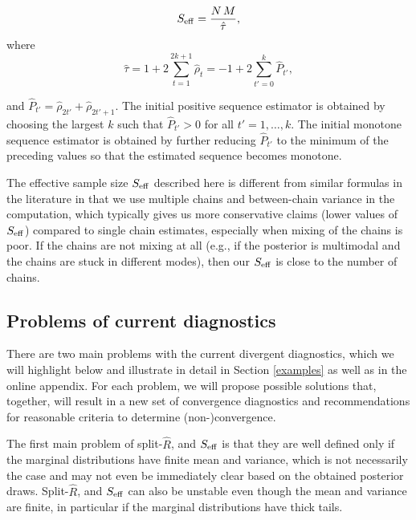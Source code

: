 \documentclass[american,]{article}
\begin{document}
\begin{equation}
S_{\rm eff} = \frac{N \, M}{\hat{\tau}},
\end{equation} where \begin{equation}
\hat{\tau} = 1 + 2 \sum_{t=1}^{2k+1} \hat{\rho}_t = 
-1 + 2 \sum_{t'=0}^{k} \hat{P}_{t'},
\end{equation}

and \(\hat{P}_{t'}=\hat{\rho}_{2t'}+\hat{\rho}_{2t'+1}\). The initial
positive sequence estimator is obtained by choosing the largest \(k\)
such that \(\hat{P}_{t'}>0\) for all \(t' = 1,\ldots,k\). The initial
monotone sequence estimator is obtained by further reducing
\(\hat{P}_{t'}\) to the minimum of the preceding values so that the
estimated sequence becomes monotone.

The effective sample size \(S_{\rm eff}\) described here is different
from similar formulas in the literature in that we use multiple chains
and between-chain variance in the computation, which typically gives us
more conservative claims (lower values of \(S_{\rm eff}\)) compared to
single chain estimates, especially when mixing of the chains is poor. If
the chains are not mixing at all (e.g., if the posterior is multimodal and
the chains are stuck in different modes), then our \(S_{\rm eff}\) is
close to the number of chains.

\hypertarget{problems-of-current-diagnostics}{%
\subsection{Problems of current
diagnostics}\label{problems-of-current-diagnostics}}

There are two main problems with the current divergent diagnostics, which we
will highlight below and illustrate in detail in Section \ref{examples} as well 
as in the online appendix. For each problem, we will propose possible solutions 
that, together, will result in a new set of convergence diagnostics and 
recommendations for reasonable criteria to determine (non-)convergence.

The first main problem of split-\(\widehat{R}\), and \(S_{\rm eff}\)
is that they are well defined only if the marginal distributions have finite 
mean and variance, which is not necessarily the case and may not even be immediately
clear based on the obtained posterior draws. Split-\(\widehat{R}\), and 
\(S_{\rm eff}\) can also be unstable even though the mean and variance are 
finite, in particular if the marginal distributions have thick tails. 
\end{document}
